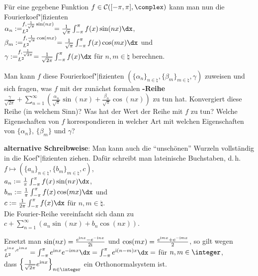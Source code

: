 \linie

Für eine gegebene Funktion $f \in \C([-\pi, \pi], \complex)$ kann man nun
die Fourierkoef"|fizienten\\
$\alpha_n := \sp{f, \frac{1}{\sqrt{\pi}} \sin(nx)}_{L^2} =
\frac{1}{\sqrt{\pi}} \int_{-\pi}^\pi f(x)\sin(nx)\dx$,\\
$\beta_m := \sp{f, \frac{1}{\sqrt{\pi}} \cos(mx)}_{L^2} =
\frac{1}{\sqrt{\pi}} \int_{-\pi}^\pi f(x)\cos(mx)\dx$ und\\
$\gamma := \sp{f, \frac{1}{\sqrt{2\pi}}}_{L^2} =
\frac{1}{\sqrt{2\pi}} \int_{-\pi}^\pi f(x)\dx$
für $n, m \in \natural$ berechnen.

Man kann $f$ diese Fourierkoef"|fizienten
$(\{\alpha_n\}_{n \in \natural}, \{\beta_m\}_{m \in \natural}, \gamma)$
zuweisen und sich fragen, was $f$ mit der zunächst formalen
\textbf{-Reihe}
$\frac{\gamma}{\sqrt{2\pi}} +
\sum_{n=1}^\infty \left(\frac{\alpha_n}{\sqrt{\pi}} \sin(nx) +
\frac{\beta_n}{\sqrt{\pi}} \cos(nx)\right)$ zu tun hat.
Konvergiert diese Reihe (in welchem Sinn)?
Was hat der Wert der Reihe mit $f$ zu tun?
Welche Eigenschaften von $f$ korrespondieren in welcher Art mit welchen
Eigenschaften von $\{\alpha_n\}$, $\{\beta_m\}$ und $\gamma$?

\textbf{alternative Schreibweise}:
Man kann auch die "`unschönen"' Wurzeln vollständig in die Koef"|fizienten
ziehen.
Dafür schreibt man lateinische Buchstaben, d.\,h.
$f \mapsto (\{a_n\}_{n \in \natural}, \{b_m\}_{m \in \natural}, c)$,\\
$a_n := \frac{1}{\pi} \int_{-\pi}^\pi f(x)\sin(nx)\dx$,\\
$b_m := \frac{1}{\pi} \int_{-\pi}^\pi f(x)\cos(mx)\dx$ und\\
$c := \frac{1}{2\pi} \int_{-\pi}^\pi f(x)\dx$ für $n, m \in \natural$.\\
Die Fourier-Reihe vereinfacht sich dann zu
$c + \sum_{n=1}^\infty (a_n \sin(nx) + b_n \cos(nx))$.

\linie
\pagebreak

Ersetzt man $\sin(nx) = \frac{e^{\mathrm{i} nx} - e^{-\mathrm{i} nx}}{2\mathrm{i}}$ und
$\cos(mx) = \frac{e^{\mathrm{i} mx} + e^{-\mathrm{i} mx}}{2}$, so gilt wegen\\
$\sp{e^{\i nx}, e^{\i mx}}_{L^2} = \int_{-\pi}^\pi e^{\i nx} e^{-\i mx}\dx =
\int_{-\pi}^\pi e^{\i (n - m)x}\dx =$
für $n, m \in \integer$,\\
dass $\left\{\frac{1}{\sqrt{2\pi}} e^{\i nx}\right\}_{n \in \integer}$
ein Orthonormalsystem ist.

